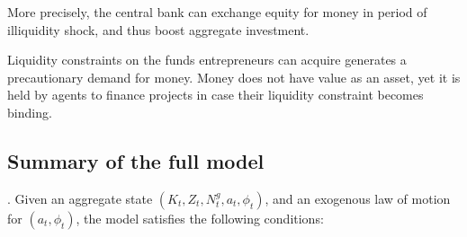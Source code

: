 \documentclass{amsart}
\theoremstyle{definition}
\theoremstyle{remark}
\numberwithin{equation}{section}
\begin{document}
More precisely, the central bank can exchange equity for money in period of illiquidity shock, and thus boost aggregate investment. 

Liquidity constraints on the funds entrepreneurs can acquire generates a precautionary demand for money. Money does not have value as an asset, yet it is held by agents to finance projects in case their liquidity constraint becomes binding.\\



\subsection*{Summary of the full model}. Given an aggregate state $\left(K_{t}, Z_{t}, N_{t}^{g}, a_{t}, \phi_{t}\right)$, and an exogenous law of motion for $\left(a_{t}, \phi_{t}\right)$, the model satisfies the following conditions:
\end{document}
